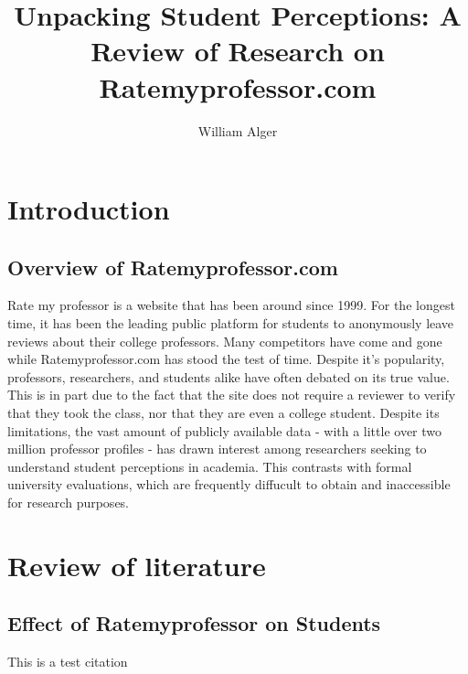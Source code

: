 \documentclass[man,12pt, twocolumn]{apa6}
\title{Unpacking Student Perceptions: A Review of Research on Ratemyprofessor.com}
\author{William Alger}
\affiliation{Northern Kentucky University}
\begin{document}
\maketitle

\section{Introduction}

\subsection{Overview of Ratemyprofessor.com}
Rate my professor is a website that has been around since 1999. For the longest time,
it has been the leading public platform for students to anonymously leave reviews about 
their college professors. Many competitors have come and gone while Ratemyprofessor.com
has stood the test of time. Despite it's popularity, professors, researchers, and students
alike have often debated on its true value. This is in part due to the fact that the site 
does not require a reviewer to verify that they took the class, nor that they are even a 
college student. Despite its limitations, the vast amount of publicly available data - 
with a little over two million professor profiles - has drawn interest among researchers seeking to
understand student perceptions in academia. This contrasts with formal university evaluations, which are
frequently diffucult to obtain and inaccessible for research purposes.


\section{Review of literature}
\subsection{Effect of Ratemyprofessor on Students}
This is a test citation \textcite*{lewandowski_just_2012} 






\printbibliography
\end{document}
